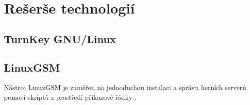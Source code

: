 \chapter{Rešerše technologií}
\section{TurnKey GNU/Linux}
\section{LinuxGSM}
Nástroj LinuxGSM je zaměřen na jednoduchou instalaci a správu herních serverů pomocí skriptů z prostředí příkazové řádky \cite{linuxgsm}. 